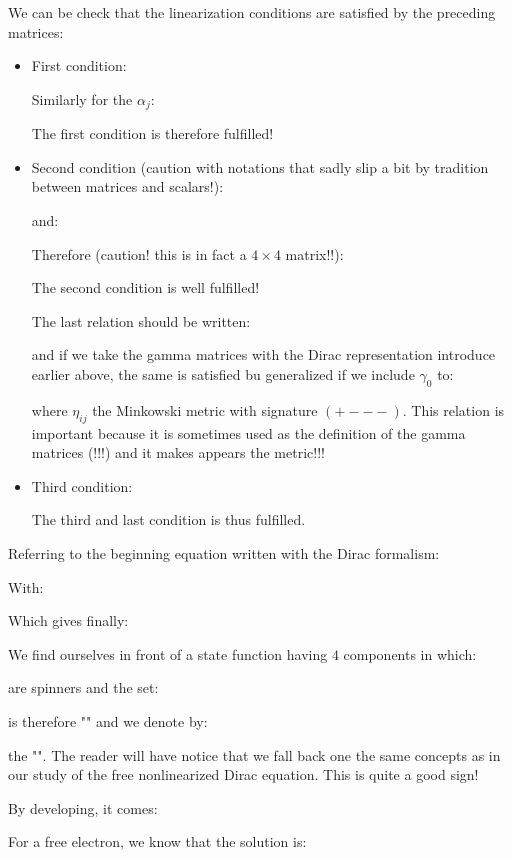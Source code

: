 	We can be check that the linearization conditions are satisfied by the preceding matrices:
	\begin{itemize}
		\item First condition:
		
		Similarly for the $\alpha_j$:
		
		The first condition is therefore fulfilled!
	
		\item Second condition (caution with notations that sadly slip a bit by tradition between matrices and scalars!):
		
		and:
		
		Therefore (caution! this is in fact a $4\times 4$ matrix!!):
		
		The second condition is well fulfilled!
		\begin{tcolorbox}[title=Remark,colframe=black,arc=10pt]
		The last relation should be written:
		
		and if we take the gamma matrices with the Dirac representation introduce earlier above, the same is satisfied bu generalized if we include $\gamma_0$ to:
		
		where $\eta_{ij}$ the Minkowski metric with signature $(+ - - -)$. This relation is important because it is sometimes used as the definition of the gamma matrices (!!!) and it makes appears the metric!!!
		\end{tcolorbox}
		
		\item Third condition:
		
		The third and last condition is thus fulfilled.
	\end{itemize}
	Referring to the beginning equation written with the Dirac formalism:
	
	With:
	
	Which gives finally:
	
	We find ourselves in front of a state function having $4$ components in which:
	
	are spinners and the set:
	
	is therefore "" and we denote by:
	
	the "". The reader will have notice that we fall back one the same concepts as in our study of the free nonlinearized Dirac equation. This is quite a good sign!
	
	By developing, it comes:
	
	For a free electron, we know that the solution is:
	
